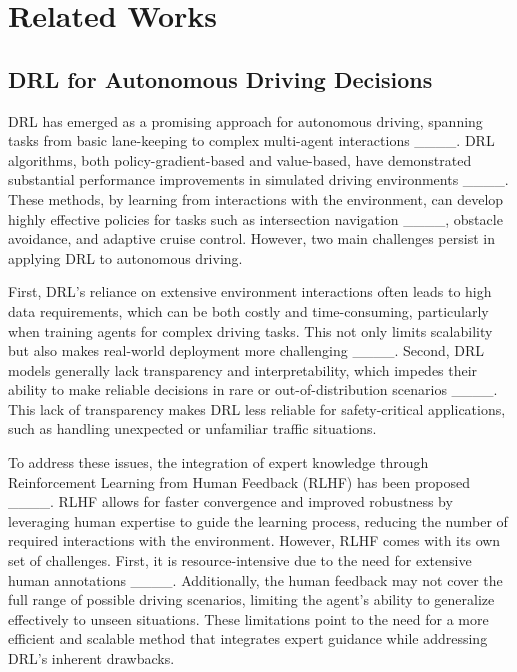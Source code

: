 \section{Related Works}
\subsection{DRL for Autonomous Driving Decisions}
DRL has emerged as a promising approach for autonomous driving, spanning tasks from basic lane-keeping to complex multi-agent interactions ____. DRL algorithms, both policy-gradient-based and value-based, have demonstrated substantial performance improvements in simulated driving environments ____. These methods, by learning from interactions with the environment, can develop highly effective policies for tasks such as intersection navigation ____, obstacle avoidance, and adaptive cruise control. However, two main challenges persist in applying DRL to autonomous driving.

First, DRL’s reliance on extensive environment interactions often leads to high data requirements, which can be both costly and time-consuming, particularly when training agents for complex driving tasks. This not only limits scalability but also makes real-world deployment more challenging ____. Second, DRL models generally lack transparency and interpretability, which impedes their ability to make reliable decisions in rare or out-of-distribution scenarios ____. This lack of transparency makes DRL less reliable for safety-critical applications, such as handling unexpected or unfamiliar traffic situations.

To address these issues, the integration of expert knowledge through Reinforcement Learning from Human Feedback (RLHF) has been proposed ____. RLHF allows for faster convergence and improved robustness by leveraging human expertise to guide the learning process, reducing the number of required interactions with the environment. However, RLHF comes with its own set of challenges. First, it is resource-intensive due to the need for extensive human annotations ____. Additionally, the human feedback may not cover the full range of possible driving scenarios, limiting the agent's ability to generalize effectively to unseen situations. These limitations point to the need for a more efficient and scalable method that integrates expert guidance while addressing DRL's inherent drawbacks.


